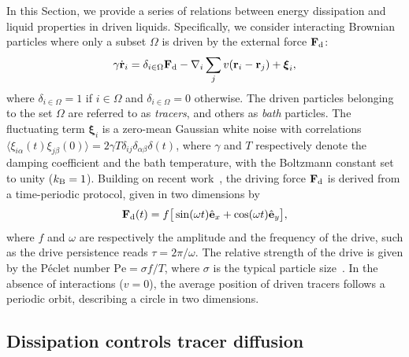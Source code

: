 \documentclass[superscriptaddress, twocolumn, prx, longbibliography, nofootinbib]{revtex4-1}
\begin{document}
In this Section, we provide a series of relations between energy dissipation and liquid properties in driven liquids. Specifically, we consider interacting Brownian particles where only a subset $\Omega$ is driven by the external force ${\bf F}_{\rm d}$:
\begin{equation}\label{eq:dyn}
	\gamma\dot{\bf r}_i = \delta_{i\in\Omega}{\bf F}_{\rm d} - \nabla_i \sum_j v({\bf r}_i-{\bf r}_j) + {\boldsymbol\xi}_i ,
\end{equation}
where $\delta_{i\in\Omega}=1$ if $i\in\Omega$ and $\delta_{i\in\Omega}=0$ otherwise. The driven particles belonging to the set $\Omega$ are referred to as {\it tracers}, and others as {\it bath} particles. The fluctuating term ${\boldsymbol\xi}_i$ is a zero-mean Gaussian white noise with correlations $\langle\xi_{i\alpha}(t)\xi_{j\beta}(0)\rangle=2\gamma T\delta_{ij}\delta_{\alpha\beta}\delta(t)$, where $\gamma$ and $T$ respectively denote the damping coefficient and the bath temperature, with the Boltzmann constant set to unity ($k_{\rm B}=1$). Building on recent work~\cite{Han2016, delJunco2018}, the driving force ${\bf F}_\text{d}$ is derived from a time-periodic protocol, given in two dimensions by
\begin{equation}\label{eq:theta}
	{\bf F}_{\rm d}(t) = f \big[\sin(\omega t) \hat{\bf e}_x + \cos(\omega t)\hat{\bf e}_y \big] ,
\end{equation}
where $f$ and $\omega$ are respectively the amplitude and the frequency of the drive, such as the drive persistence reads $\tau=2\pi/\omega$. The relative strength of the drive is given by the P\'eclet number $\text{Pe} = \sigma f/T$, where $\sigma$ is the typical particle size~\cite{Han2016, delJunco2018}. In the absence of interactions ($v=0$), the average position of driven tracers follows a periodic orbit, describing a circle in two dimensions.




\subsection{Dissipation controls tracer diffusion}
\end{document}
